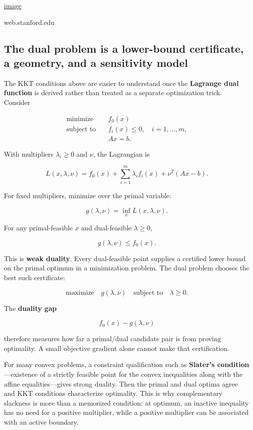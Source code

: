 \href{https://www.google.com/s2/favicons?domain=https://web.stanford.edu&sz=32}{image}

web.stanford.edu

\subsection{The dual problem is a lower-bound certificate, a geometry, and a sensitivity model}\label{02-foundations-ii-ch026-the-dual-problem-is-a-lower-bound-certificate-a-geometry-and-a-sensitivity-model}

The KKT conditions above are easier to understand once the \textbf{Lagrange dual function} is derived rather than treated as a separate optimization trick. Consider

\[
\begin{aligned}
\text{minimize}\quad & f_0(x)\\
\text{subject to}\quad & f_i(x)\le 0,\quad i=1,\ldots,m,\\
& Ax=b.
\end{aligned}
\]

With multipliers \(\lambda_i\ge0\) and \(\nu\), the Lagrangian is

\[
L(x,\lambda,\nu)
=
f_0(x)
+
\sum_{i=1}^{m}\lambda_i f_i(x)
+
\nu^T(Ax-b).
\]

For fixed multipliers, minimize over the primal variable:

\[
g(\lambda,\nu)
=
\inf_x L(x,\lambda,\nu).
\]

For any primal-feasible \(x\) and dual-feasible \(\lambda\ge0\),

\[
g(\lambda,\nu)
\le
f_0(x).
\]

This is \textbf{weak duality}. Every dual-feasible point supplies a certified lower bound on the primal optimum in a minimization problem. The dual problem chooses the best such certificate:

\[
\text{maximize}\quad g(\lambda,\nu)
\quad
\text{subject to}\quad \lambda\ge0.
\]

The \textbf{duality gap}

\[
f_0(x)-g(\lambda,\nu)
\]

therefore measures how far a primal/dual candidate pair is from proving optimality. A small objective gradient alone cannot make that certification.

For many convex problems, a constraint qualification such as \textbf{Slater's condition}---existence of a strictly feasible point for the convex inequalities along with the affine equalities---gives strong duality. Then the primal and dual optima agree and KKT conditions characterize optimality. This is why complementary slackness is more than a memorized condition: at optimum, an inactive inequality has no need for a positive multiplier, while a positive multiplier can be associated with an active boundary.

